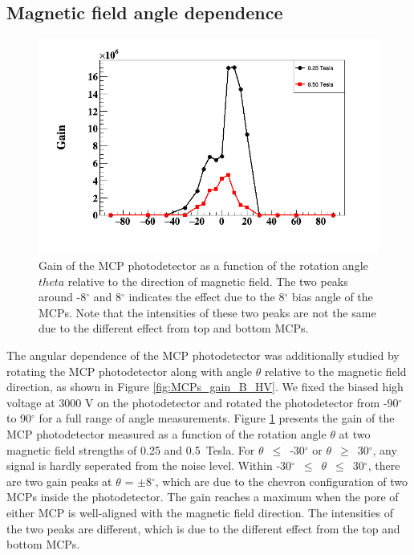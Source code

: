 \documentclass[preprint,5p]{elsarticle}
\begin{document}
\subsection{Magnetic field angle dependence}\label{subsec_theta}

\begin{figure}[tbp]
\centering 
\includegraphics[scale=0.35]{fig/MCPs_gain_theta_B.png}
\caption{Gain of the MCP photodetector as a function of the rotation angle 
   $theta$ relative to the direction of magnetic field. The two peaks around 
-8$^{\circ}$ and 8$^{\circ}$ indicates the effect due to the 8$^{\circ}$ bias 
angle of the MCPs. Note that the intensities of these two peaks are not the 
same due to the different effect from top and bottom MCPs.} 
\label{fig:MCPs_gain_theta_B}
\end{figure}
The angular dependence of the MCP photodetector was additionally studied by 
rotating the MCP photodetector along with angle $\theta$ relative to the 
magnetic field direction, as shown in Figure \ref{fig:MCPs_gain_B_HV}. We fixed 
the biased high voltage at 3000 V on the photodetector and rotated the 
photodetector from -90$^{\circ}$ to 90$^{\circ}$ for a full range of angle 
measurements. Figure \ref{fig:MCPs_gain_theta_B} presents the gain of the MCP 
photodetector measured as a function of the rotation angle $\theta$ at two 
magnetic field strengths of 0.25 and 0.5~Tesla.  For 
$\theta$~$\leq$~-30$^{\circ}$ or $\theta$~$\geq$~30$^{\circ}$, any signal is 
hardly seperated from the noise level. Within 
-30$^{\circ}$~$\leq$~$\theta$~$\leq$~30$^{\circ}$, there are two gain peaks at 
$\theta$ = $\pm$8$^{\circ}$, which are due to the chevron configuration of two 
MCPs inside the photodetector. The gain reaches a maximum when the pore of 
either MCP is well-aligned with the magnetic field direction.  The intensities 
of the two peaks are different, which is due to the different effect from the 
top and bottom MCPs.
\end{document}
